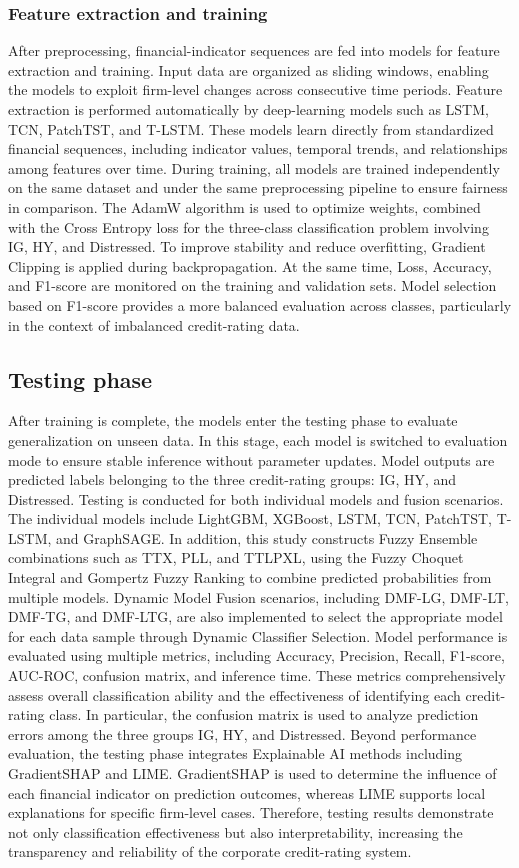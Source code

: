 \documentclass[10pt,twoside]{article}
\begin{document}
\subsubsection{Feature extraction and training}
After preprocessing, financial-indicator sequences are fed into models for feature extraction and training. Input data are organized as sliding windows, enabling the models to exploit firm-level changes across consecutive time periods. Feature extraction is performed automatically by deep-learning models such as LSTM, TCN, PatchTST, and T-LSTM. These models learn directly from standardized financial sequences, including indicator values, temporal trends, and relationships among features over time. During training, all models are trained independently on the same dataset and under the same preprocessing pipeline to ensure fairness in comparison. The AdamW algorithm is used to optimize weights, combined with the Cross Entropy loss for the three-class classification problem involving IG, HY, and Distressed. To improve stability and reduce overfitting, Gradient Clipping is applied during backpropagation. At the same time, Loss, Accuracy, and F1-score are monitored on the training and validation sets. Model selection based on F1-score provides a more balanced evaluation across classes, particularly in the context of imbalanced credit-rating data.

\subsection{Testing phase}
After training is complete, the models enter the testing phase to evaluate generalization on unseen data. In this stage, each model is switched to evaluation mode to ensure stable inference without parameter updates. Model outputs are predicted labels belonging to the three credit-rating groups: IG, HY, and Distressed. Testing is conducted for both individual models and fusion scenarios. The individual models include LightGBM, XGBoost, LSTM, TCN, PatchTST, T-LSTM, and GraphSAGE. In addition, this study constructs Fuzzy Ensemble combinations such as TTX, PLL, and TTLPXL, using the Fuzzy Choquet Integral and Gompertz Fuzzy Ranking to combine predicted probabilities from multiple models. Dynamic Model Fusion scenarios, including DMF-LG, DMF-LT, DMF-TG, and DMF-LTG, are also implemented to select the appropriate model for each data sample through Dynamic Classifier Selection. Model performance is evaluated using multiple metrics, including Accuracy, Precision, Recall, F1-score, AUC-ROC, confusion matrix, and inference time. These metrics comprehensively assess overall classification ability and the effectiveness of identifying each credit-rating class. In particular, the confusion matrix is used to analyze prediction errors among the three groups IG, HY, and Distressed. Beyond performance evaluation, the testing phase integrates Explainable AI methods including GradientSHAP and LIME. GradientSHAP is used to determine the influence of each financial indicator on prediction outcomes, whereas LIME supports local explanations for specific firm-level cases. Therefore, testing results demonstrate not only classification effectiveness but also interpretability, increasing the transparency and reliability of the corporate credit-rating system.
\end{document}
